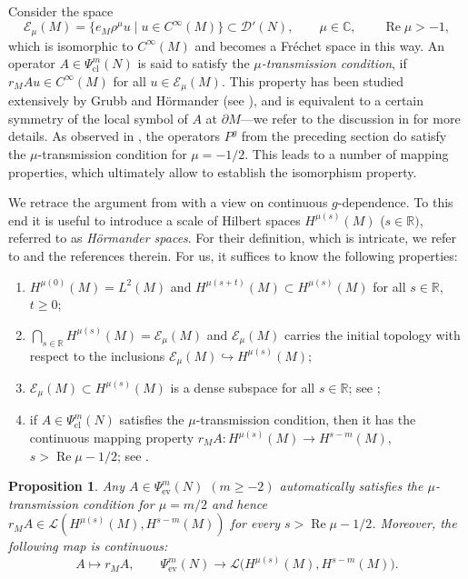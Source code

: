 \documentclass[pdftex]{sigma}
\numberwithin{equation}{section}
\newtheorem{Proposition}[Theorem]{Proposition}
\theoremstyle{definition}
\newcommand{\R}{\mathbb{R}} %
\newcommand{\C}{\mathbb{C}} %
\newcommand{\ev}{\mathrm{ev}}
\newcommand{\1}{{\bf 1}}
\newcommand{\cl}{\mathrm{cl}}
\renewcommand{\Re}{\operatorname{Re}}
\begin{document}
Consider the space
\begin{equation*}
\mathcal E_\mu(M)=\{e_M\rho^\mu u \mid u\in C^\infty(M)\} \subset \mathcal D'(N),\qquad \mu\in \C,\qquad \Re\mu >-1,
\end{equation*}
which is isomorphic to $C^\infty(M)$ and becomes a Fr{\'e}chet space in this way. An operator $A\in \Psi_\cl^m(N)$ is said to satisfy the {\it $\mu$-transmission condition}, if
$%
r_M A u\in C^\infty(M)$ for all $ u\in \mathcal E_\mu(M)$.
This property has been studied extensively by Grubb and H{\"o}rmander (see \cite{Gru15}), and is equivalent to a certain symmetry of the local symbol of $A$ at $\partial M$---we refer to the discussion in \cite[p.~27]{MNP19a} for more details. As observed in \cite[Lemma 4.2]{MNP19a}, the operators $P^g$ from the preceding section do satisfy the $\mu$-transmission condition for $\mu=-1/2$. This leads to a number of mapping properties, which ultimately allow to establish the isomorphism property.

We retrace the argument from \cite{MNP19a} with a view on continuous $g$-dependence. To this end it is useful to introduce a scale of Hilbert spaces $H^{\mu(s)}(M)$ ($s\in \R)$, referred to as {\it H{\"o}rmander spaces}. For their definition, which is intricate, we refer to \cite[p.~29]{MNP19a} and the references therein. For us, it suffices to know the following properties:
\begin{enumerate}[label=(\roman*)]\itemsep=0pt
\item $H^{\mu(0)}(M)=L^2(M)$ and $H^{\mu(s+t)}(M)\subset H^{\mu(s)}(M)$ for all $s\in \R$, $t\ge 0$;

\item $\bigcap_{s\in \R} H^{\mu(s)}(M) = \mathcal E_\mu(M)$ and $\mathcal E_\mu(M)$ carries the initial topology with respect to the inclusions $\mathcal E_\mu(M)\hookrightarrow H^{\mu(s)}(M)$;

\item $\mathcal E_\mu(M)\subset H^{\mu(s)}(M)$ is a dense subspace for all $s\in \R$; see \cite[Proposition 4.1]{Gru15};

\item if $A\in \Psi^m_\cl(N)$ satisfies the $\mu$-transmission condition, then it has the continuous mapping property $
r_M A\colon H^{\mu(s)}(M)\rightarrow H^{s-m}(M)$, $ s>\Re \mu -1/2$;
see \cite[Theorem 4.2]{Gru15}.
\end{enumerate}

\begin{Proposition}\label{ctsctsaction} Any $A\in \Psi_{\ev}^m(N)$ $(m\ge -2)$ automatically satisfies the $\mu$-transmission condition for $\mu=m/2$ and hence $r_MA\in \mathcal L(H^{\mu(s)}(M),H^{s-m}(M))$ for every $s>\Re \mu -1/2$. Moreover, the following map is continuous:
\[%
A\mapsto r_MA,\qquad \Psi_{\ev}^m(N) \rightarrow \mathcal L\big(H^{\mu(s)}(M),H^{s-m}(M)\big).
\]
\end{Proposition}
\end{document}

